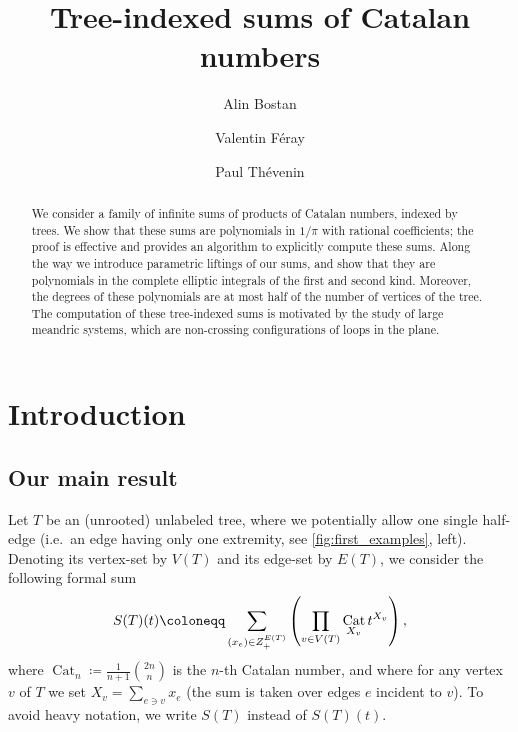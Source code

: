 \documentclass[12pt]{amsart}
\title{Tree-indexed sums of Catalan numbers}
\author[A. Bostan]{Alin Bostan}
\author[V. Féray]{Valentin Féray}
\author[P. Thévenin]{Paul Thévenin}
\theoremstyle{plain}
\theoremstyle{remark}
\def\Z{\mathbb{Z}}
\DeclareMathOperator{\Cat}{Cat}
\begin{document}
\maketitle 

\begin{abstract}
We consider a family of infinite sums of products of Catalan numbers, indexed by trees. 
We show that these sums are polynomials in $1/\pi$ with rational coefficients; the proof is effective and provides an algorithm to explicitly compute these sums. 
Along the way we introduce parametric liftings of our sums, and show that they are polynomials in the complete elliptic integrals of the first and second kind. Moreover, the degrees of these polynomials are at most half of the number of vertices of the tree.  
The computation of these tree-indexed sums is motivated by the study of large meandric systems, which are non-crossing configurations of loops in the plane.
\end{abstract}

\section{Introduction}

\subsection{Our main result}
Let $T$ be an 
(unrooted) unlabeled tree, 
where we potentially allow one single half-edge 
(i.e.~an edge having only one extremity, see \cref{fig:first_examples}, left).
Denoting its vertex-set by $V(T)$ and its edge-set by
$E(T)$, we consider the following formal sum
\begin{equation}\label{eq:def_ST}
 S(T)(t) \coloneqq
 \sum_{(x_e) \in \mathbb \Z_+^{E(T)}}  \left( \prod_{v \in V(T)}
  \Cat_{X_v} t^{X_v} \right),
  \end{equation}
where $\Cat_n \coloneqq \frac{1}{n+1} \binom{2n}{n}$ is the $n$-th Catalan number, and where for any vertex $v$ of $T$ we set $X_v=\sum_{e \ni v} x_e$ (the sum is taken over edges $e$ incident to $v$). To avoid heavy notation, we write $S(T)$ instead of $S(T)(t)$.
\end{document}
